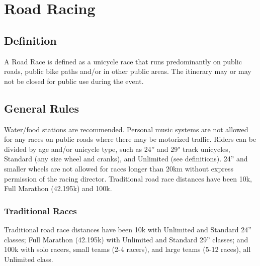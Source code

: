 \chapter{Road Racing}

\section{Definition}
A Road Race is defined as a unicycle race that runs predominantly on public roads, public bike paths and/or in other public areas. The itinerary may or may not be closed for public use during the event. 

\section{General Rules}
Water/food stations are recommended. Personal music systems are not allowed for any races on public roads where there may be motorized traffic. Riders can be divided by age and/or unicycle type, such as 24” and 29" track unicycles, Standard (any size wheel and cranks), and Unlimited (see definitions). 24” and smaller wheels are not allowed for races longer than 20km without express permission of the racing director. 
Traditional road race distances have been 10k, Full Marathon (42.195k) and 100k.

\subsection{Traditional Races}
Traditional road race distances have been 10k with Unlimited and Standard 24” classes; Full Marathon (42.195k) with Unlimited and Standard 29” classes; and 100k with solo racers, small teams (2-4 racers), and large teams (5-12 races), all Unlimited class.